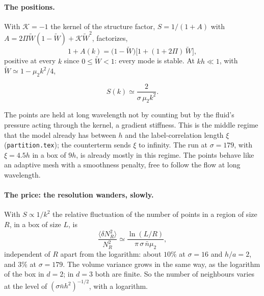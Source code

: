 \documentclass[11pt,aps,preprint,nofootinbib,superscriptaddress,tightenlines]{revtex4-2}
\newcommand{\avg}[1]{\langle #1\rangle}
\def\st{\begin{equation}}
\def\stp{\end{equation}}
\let\oldparagraph\paragraph
\renewcommand{\paragraph}{\par\bigskip\oldparagraph}
\begin{document}
\paragraph{The positions.}  With $\mathcal K=-1$ the kernel of the structure factor, $S=1/(1+A)$ with $A=2\Pi\widetilde W(1-\widetilde W)+\mathcal K\widetilde W^2$, factorizes,
\st
1+A(k)=\big(1-\widetilde W\big)\big[1+(1+2\Pi)\,\widetilde W\big],
\stp
positive at every $k$ since $0\le\widetilde W<1$: every mode is stable.  At $kh\ll1$, with $\widetilde W\simeq1-\mu_2k^2/4$,
\begin{keyeq}
\st
S(k)\simeq\frac{2}{\sigma\,\mu_2k^2} .
\stp
\end{keyeq}
The points are held at long wavelength not by counting but by the fluid's pressure acting through the kernel, a gradient stiffness.  This is the middle regime
that the model already has between $h$ and the label-correlation length $\xi$ (\texttt{partition.tex}); the counterterm sends $\xi$ to infinity.  The run at
$\sigma=179$, with $\xi=4.5h$ in a box of $9h$, is already mostly in this regime.  The points behave like an adaptive mesh with a smoothness penalty, free to
follow the flow at long wavelength.

\paragraph{The price: the resolution wanders, slowly.}  With $S\propto1/k^2$ the relative fluctuation of the number of points in a region of size $R$, in a box of
size $L$, is
\st
\frac{\avg{\delta N_R^2}}{N_R^2}\simeq\frac{\ln(L/R)}{\pi\,\sigma\,\bar n\mu_2} ,
\stp
independent of $R$ apart from the logarithm: about $10\%$ at $\sigma=16$ and $h/a=2$, and $3\%$ at $\sigma=179$.  The volume variance grows in the same way,
as the logarithm of the box in $d=2$; in $d=3$ both are finite.  So the number of neighbours varies at the level of $(\sigma\bar nh^2)^{-1/2}$, with a logarithm.
\end{document}
